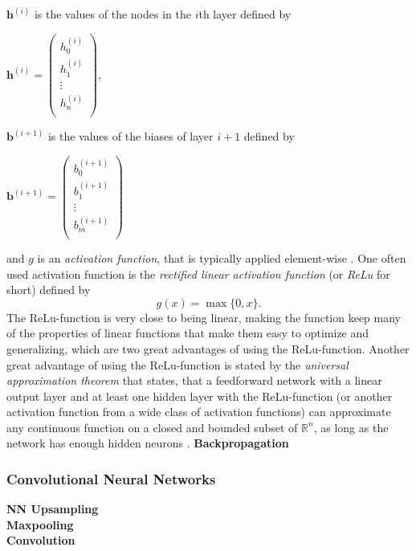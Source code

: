 \documentclass[main.tex]{subfiles}
\begin{document}
$\bm{h}^{(i)}$ is the values of the nodes in the $i$th layer defined by
\begin{center}
    \begin{math}
        \bm{h}^{(i)} =
        \begin{pmatrix}
            h_{0} ^{(i)} \\
            h_{1} ^{(i)} \\
            \vdots \\
            h_{n} ^{(i)} \\
        \end{pmatrix}
        ,
    \end{math}
\end{center}
$\bm{b}^{(i + 1)}$ is the values of the biases of layer $i + 1$ defined by
\begin{center}
    \begin{math}
        \bm{b}^{(i + 1)} =
        \begin{pmatrix}
            b_{0} ^{(i + 1)} \\
            b_{1} ^{(i + 1)} \\
            \vdots \\
            b_{m} ^{(i + 1)} \\
        \end{pmatrix}
    \end{math}
\end{center}
and $g$ is an \textit{activation function}, that is typically applied element-wise \cite{DeepLearning} \cite{3b1b_1}. One often used activation function is the \textit{rectified linear activation function} (or \textit{ReLu} for short) defined by
$$g(x) = \max\{0, x\}.$$
The ReLu-function is very close to being linear, making the function keep many of the properties of linear functions that make them easy to optimize and generalizing, which are two great advantages of using the ReLu-function. Another great advantage of using the ReLu-function is stated by the \textit{universal approximation theorem} that states, that a feedforward network with a linear output layer and at least one hidden layer with the ReLu-function (or another activation function from a wide class of activation functions) can approximate any continuous function on a closed and bounded subset of $\mathbb{R}^n$, as long as the network has enough hidden neurons \cite{DeepLearning}. 
\noindent \textbf{Backpropagation} \\

\subsubsection{Convolutional Neural Networks}
\textbf{NN Upsampling} \\
\textbf{Maxpooling} \\
\textbf{Convolution}
\end{document}
